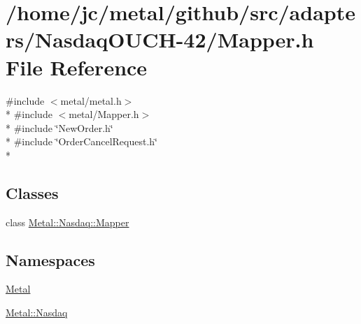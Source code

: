 \hypertarget{src_2adapters_2NasdaqOUCH-42_2Mapper_8h}{}\section{/home/jc/metal/github/src/adapters/\+Nasdaq\+O\+U\+C\+H-\/42/\+Mapper.h File Reference}
\label{src_2adapters_2NasdaqOUCH-42_2Mapper_8h}
{\ttfamily \#include $<$metal/metal.\+h$>$}\\*
{\ttfamily \#include $<$metal/\+Mapper.\+h$>$}\\*
{\ttfamily \#include \char`\"{}New\+Order.\+h\char`\"{}}\\*
{\ttfamily \#include \char`\"{}Order\+Cancel\+Request.\+h\char`\"{}}\\*
\subsection*{Classes}
\begin{DoxyCompactItemize}
\item 
class \hyperlink{classMetal_1_1Nasdaq_1_1Mapper}{Metal\+::\+Nasdaq\+::\+Mapper}
\end{DoxyCompactItemize}
\subsection*{Namespaces}
\begin{DoxyCompactItemize}
\item 
 \hyperlink{namespaceMetal}{Metal}
\item 
 \hyperlink{namespaceMetal_1_1Nasdaq}{Metal\+::\+Nasdaq}
\end{DoxyCompactItemize}
